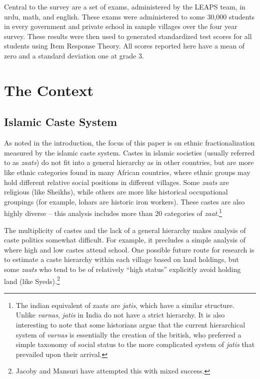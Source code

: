 \documentclass[12pt]{article}
\begin{document}
Central to the survey are a set of exams, administered by the LEAPS team, in urdu, math, and english. These exams were administered to some 30,000 students in every government and private school in sample villages over the four year survey. These results were then used to generated standardized test scores for all students using Item Response Theory. All scores reported here have a mean of zero and a standard deviation one at grade 3. 

\section{The Context}\label{overview}

\subsection{Islamic Caste System}\label{}

As noted in the introduction, the focus of this paper is on ethnic fractionalization measured by the islamic caste system. Castes in islamic societies (usually referred to as \emph{zaats}) do not fit into a general hierarchy as in other countries, but are more like ethnic categories found in many African countries, where ethnic groups may hold different relative social positions in different villages. Some \emph{zaats} are religious (like Sheikhs), while others are more like historical occupational groupings (for example, lohars are historic iron workers). These castes are also highly diverse -- this analysis includes more than 20 categories of \emph{zaat}.\footnote{The indian equivalent of zaats are \emph{jatis}, which have a similar structure. Unlike \emph{varnas}, \emph{jatis} in India do not have a strict hierarchy. It is also interesting to note that some historians argue that the current hierarchical system of \emph{varnas} is essentially the creation of the british, who preferred a simple taxonomy of social status to the more complicated system of \emph{jatis} that prevailed upon their arrival.}

The multiplicity of castes and the lack of a general hierarchy makes analysis of caste politics somewhat difficult. For example, it precludes a simple analysis of where high and low castes attend school. One possible future route for research is to estimate a caste hierarchy within each village based on land holdings, but some \emph{zaats} who tend to be of relatively ``high status'' explicitly avoid holding land (like Syeds).\footnote{Jacoby and Mansuri have attempted this with mixed success.}
\end{document}
